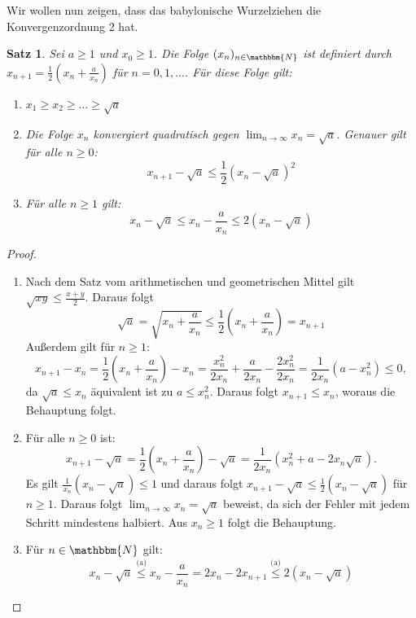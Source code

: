 \documentclass[12pt]{article}
\newcommand{\N}{\mathbbm{N}} %
\newtheorem{satz}{Satz}[section]
\begin{document}
\noindent Wir wollen nun zeigen, dass das babylonische Wurzelziehen die Konvergenzordnung 2 hat. 

\begin{satz}
    Sei $a \geq 1$ und $x_0 \geq 1$. Die Folge $(x_n)_{n \in \N}$ ist definiert durch $x_{n+1}= \frac{1}{2}\left(x_n+ \frac{a}{x_n}\right)$ für $n=0,1,...$. Für diese Folge gilt:
    \begin{enumerate}[label=(\alph*)]
        \item $x_1 \geq x_2 \geq ... \geq \sqrt{a}$
        \item Die Folge $x_n$ konvergiert quadratisch gegen $\lim_{n \to \infty} x_n= \sqrt{a}$. Genauer gilt für alle $n \geq0$:
        \begin{equation*}
            x_{n+1}- \sqrt{a} \leq \frac{1}{2}(x_n-\sqrt{a})^2
        \end{equation*}
        \item Für alle $n \geq 1$ gilt:
        \begin{equation*}
            x_n- \sqrt{a} \leq x_n - \frac{a}{x_n} \leq 2(x_n- \sqrt{a})
        \end{equation*}
    \end{enumerate}
\end{satz}
\begin{proof} 
    \begin{enumerate}[label=(\alph*)]
        \item Nach dem Satz vom arithmetischen und geometrischen Mittel gilt $\sqrt{xy} \leq \frac{x+y}{2}$. Daraus folgt
        \begin{equation*}
            \sqrt{a}= \sqrt{x_n+\frac{a}{x_n}} \leq \frac{1}{2} \left(x_n + \frac{a}{x_n}\right)=x_{n+1}
        \end{equation*}
        Außerdem gilt für $n\geq 1$:
        \begin{equation*}
            x_{n+1}-x_n= \frac{1}{2} \left(x_n+ \frac{a}{x_n} \right)-x_n= \frac{x_n^2}{2x_n}+ \frac{a}{2x_n}- \frac{2x_n^2}{2x_n}= \frac{1}{2x_n}(a-x_n^2)\leq0,
        \end{equation*}
        da $\sqrt{a} \leq x_n$ äquivalent ist zu $a \leq x_n^2$. Daraus folgt $x_{n+1} \leq x_n$, woraus die Behauptung folgt.
        \item Für alle $n \geq 0$ ist:
        \begin{equation*}
            x_{n+1}-\sqrt{a}= \frac{1}{2} \left(x_n+ \frac{a}{x_n} \right)- \sqrt{a} = \frac{1}{2x_n}(x_n^2+a-2x_n\sqrt{a}).
        \end{equation*}
        Es gilt $\frac{1}{x_n}(x_n-\sqrt{a})\leq 1$ und daraus folgt $x_{n+1}-\sqrt{a} \leq \frac{1}{2}(x_n-\sqrt{a})$ für $n \geq1$. Daraus folgt $\lim_{n \to \infty} x_n = \sqrt{a}$ beweist, da sich der Fehler mit jedem Schritt mindestens halbiert. Aus $x_n \geq 1$ folgt die Behauptung.
        \item Für $n \in \N$ gilt:
        \begin{equation*}
            x_n-\sqrt{a} \overset{\text{(a)}}{\leq} x_n- \frac{a}{x_n}=  2x_n-2x_{n+1} \overset{\text{(a)}}{\leq} 2(x_n- \sqrt{a}) 
        \end{equation*} 
    \end{enumerate}
\end{proof}
\end{document}
